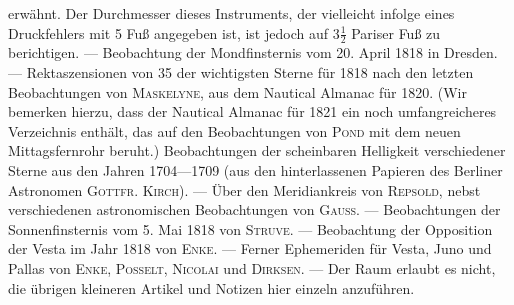 erwähnt. Der Durchmesser dieses Instruments, der vielleicht infolge eines Druckfehlers mit 5 Fuß angegeben ist, ist jedoch auf $3\tfrac{1}{2}$ Pariser Fuß zu berichtigen. --- Beobachtung der Mondfinsternis vom 20. April 1818 in Dresden. --- Rektaszensionen von 35 der wichtigsten Sterne für 1818 nach den letzten Beobachtungen von \textsc{Maskelyne}, aus dem Nautical Almanac für 1820. (Wir bemerken hierzu, dass der Nautical Almanac für 1821 ein noch umfangreicheres Verzeichnis enthält, das auf den Beobachtungen von \textsc{Pond} mit dem neuen Mittagsfernrohr beruht.) Beobachtungen der scheinbaren Helligkeit verschiedener Sterne aus den Jahren 1704---1709 (aus den hinterlassenen Papieren des Berliner Astronomen \textsc{Gottfr. Kirch}). --- Über den Meridiankreis von \textsc{Repsold}, nebst verschiedenen astronomischen Beobachtungen von \textsc{Gauss}. --- Beobachtungen der Sonnenfinsternis vom 5. Mai 1818 von \textsc{Struve}. --- Beobachtung der Opposition der Vesta im Jahr 1818 von \textsc{Enke}. --- Ferner Ephemeriden für Vesta, Juno und Pallas von \textsc{Enke}, \textsc{Posselt}, \textsc{Nicolai} und \textsc{Dirksen}. --- Der Raum erlaubt es nicht, die übrigen kleineren Artikel und Notizen hier einzeln anzuführen.
\par\clearpage\endgroup
